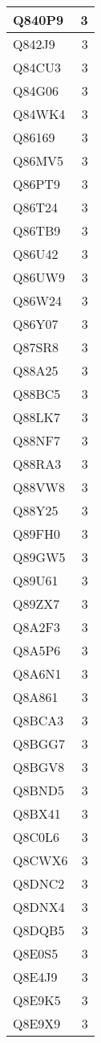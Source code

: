 \documentclass[
]{book}
\theoremstyle{definition}
\theoremstyle{definition}
\theoremstyle{definition}
\theoremstyle{definition}
\theoremstyle{remark}
\begin{document}
\begin{table}
\begin{tabular}{l|r}
\hline
Q840P9 & 3\\
\hline
Q842J9 & 3\\
\hline
Q84CU3 & 3\\
\hline
Q84G06 & 3\\
\hline
Q84WK4 & 3\\
\hline
Q86169 & 3\\
\hline
Q86MV5 & 3\\
\hline
Q86PT9 & 3\\
\hline
Q86T24 & 3\\
\hline
Q86TB9 & 3\\
\hline
Q86U42 & 3\\
\hline
Q86UW9 & 3\\
\hline
Q86W24 & 3\\
\hline
Q86Y07 & 3\\
\hline
Q87SR8 & 3\\
\hline
Q88A25 & 3\\
\hline
Q88BC5 & 3\\
\hline
Q88LK7 & 3\\
\hline
Q88NF7 & 3\\
\hline
Q88RA3 & 3\\
\hline
Q88VW8 & 3\\
\hline
Q88Y25 & 3\\
\hline
Q89FH0 & 3\\
\hline
Q89GW5 & 3\\
\hline
Q89U61 & 3\\
\hline
Q89ZX7 & 3\\
\hline
Q8A2F3 & 3\\
\hline
Q8A5P6 & 3\\
\hline
Q8A6N1 & 3\\
\hline
Q8A861 & 3\\
\hline
Q8BCA3 & 3\\
\hline
Q8BGG7 & 3\\
\hline
Q8BGV8 & 3\\
\hline
Q8BND5 & 3\\
\hline
Q8BX41 & 3\\
\hline
Q8C0L6 & 3\\
\hline
Q8CWX6 & 3\\
\hline
Q8DNC2 & 3\\
\hline
Q8DNX4 & 3\\
\hline
Q8DQB5 & 3\\
\hline
Q8E0S5 & 3\\
\hline
Q8E4J9 & 3\\
\hline
Q8E9K5 & 3\\
\hline
Q8E9X9 & 3\\

\end{tabular}
\end{table}
\end{document}
